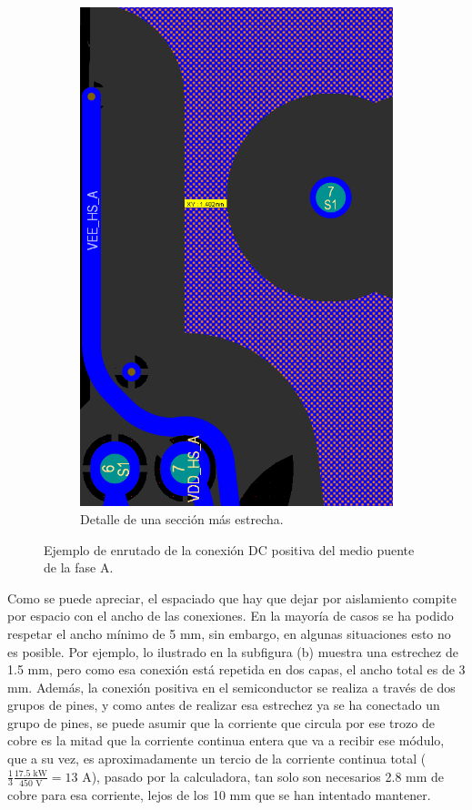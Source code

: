 \begin{figure}[H]
\begin{subfigure}{0.4\linewidth}
		\includegraphics[width=\linewidth]{fig/layout2}
		\caption{Detalle de una sección más estrecha.}
	\end{subfigure}
	\caption{Ejemplo de enrutado de la conexión DC positiva del medio puente de la fase A.}
\end{figure}

Como se puede apreciar, el espaciado que hay que dejar por aislamiento compite por espacio con el ancho de las conexiones. En la mayoría de casos se ha podido respetar el ancho mínimo de 5 mm, sin embargo, en algunas situaciones esto no es posible. Por ejemplo, lo ilustrado en la subfigura (b) muestra una estrechez de 1.5 mm, pero como esa conexión está repetida en dos capas, el ancho total es de 3 mm. Además, la conexión positiva en el semiconductor se realiza a través de dos grupos de pines, y como antes de realizar esa estrechez ya se ha conectado un grupo de pines, se puede asumir que la corriente que circula por ese trozo de cobre es la mitad que la corriente continua entera que va a recibir ese módulo, que a su vez, es aproximadamente un tercio de la corriente continua total ($\frac{1}{3}\frac{17.5 \text{ kW}}{450 \text{ V}} = 13 \text{ A}$), pasado por la calculadora, tan solo son necesarios 2.8 mm de cobre para esa corriente, lejos de los 10 mm que se han intentado mantener.


